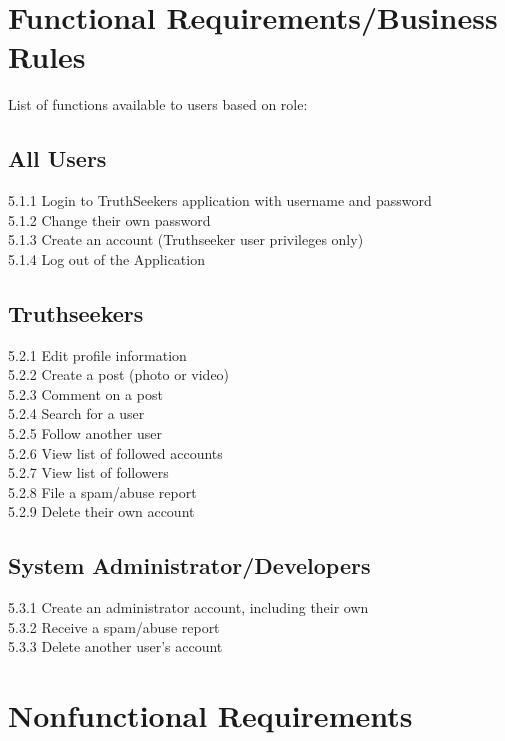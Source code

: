 \newpage

\chapter{Functional Requirements/Business Rules}
\label{FRequirements}

List of functions available to users based on role:

\section{All Users}
{5.1.1 \quad	Login to TruthSeekers application with username and password \\
5.1.2 \quad	Change their own password \\
5.1.3 \quad	Create an account (Truthseeker user privileges only) \\
5.1.4 \quad	Log out of the Application 
}

\section{Truthseekers}
{5.2.1 \quad	Edit profile information \\
5.2.2 \quad	Create a post (photo or video) \\
5.2.3 \quad Comment on a post \\
5.2.4 \quad Search for a user \\
5.2.5 \quad Follow another user \\
5.2.6 \quad View list of followed accounts \\
5.2.7 \quad View list of followers \\
5.2.8 \quad File a spam/abuse report \\
5.2.9 \quad Delete their own account 
}

\section{System Administrator/Developers}
{5.3.1 \quad Create an administrator account, including their own \\
5.3.2 \quad Receive a spam/abuse report \\
5.3.3 \quad Delete another user’s account
}

\newpage

\chapter{Nonfunctional Requirements}
\label{NFRequirements}

